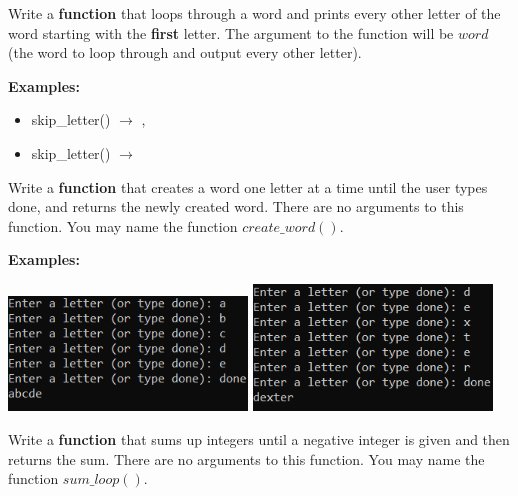 	\item 
		Write a \textbf{function} that loops through a word and prints every other letter of the word starting with the \textbf{first} letter.
		The argument to the function will be $word$ (the word to loop through and output every other letter).

		\textbf{Examples:}		
		\begin{itemize}
			\item  skip\_letter() $\rightarrow$ , 
			\item  skip\_letter() $\rightarrow$ 
		\end{itemize}


	\item 
		Write a \textbf{function} that creates a word one letter at a time until the 
		user types done, and returns the newly created word. There are no arguments to 
		this function. 	You may name the function $create\_word()$.

		\textbf{Examples:} \\
		 \begin{center}
		\includegraphics[width = 2.5in]{./imgs/lettersAbcde.PNG} \hspace{0.5in} 
		\includegraphics[width = 2.5in]{./imgs/lettersDexter.PNG}
		\end{center}


	\item 
		Write a \textbf{function} that sums up integers until a negative integer is given 
		and then returns the sum.
		There are no arguments to this function. You may name the function $sum\_loop()$.

